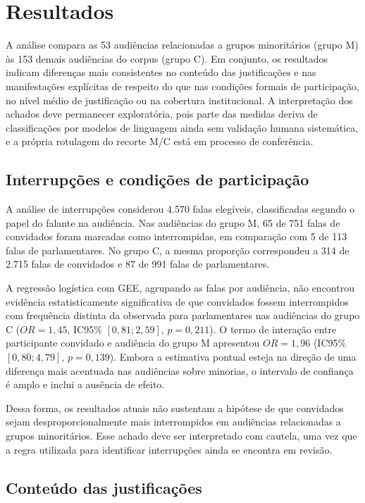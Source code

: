 \section{Resultados}

A análise compara as 53 audiências relacionadas a grupos minoritários
(grupo M) às 153 demais audiências do corpus (grupo C). Em conjunto, os
resultados indicam diferenças mais consistentes no conteúdo das justificações
e nas manifestações explícitas de respeito do que nas condições formais de
participação, no nível médio de justificação ou na cobertura institucional. A
interpretação dos achados deve permanecer exploratória, pois parte das
medidas deriva de classificações por modelos de linguagem ainda sem validação
humana sistemática, e a própria rotulagem do recorte M/C está em processo de
conferência.

\subsection{Interrupções e condições de participação}

A análise de interrupções considerou 4.570 falas elegíveis, classificadas
segundo o papel do falante na audiência. Nas audiências do grupo M, 65 de 751
falas de convidados foram marcadas como interrompidas, em comparação com 5 de
113 falas de parlamentares. No grupo C, a mesma proporção correspondeu a 314
de 2.715 falas de convidados e 87 de 991 falas de parlamentares.

A regressão logística com GEE, agrupando as falas por audiência, não encontrou
evidência estatisticamente significativa de que convidados fossem interrompidos
com frequência distinta da observada para parlamentares nas audiências do grupo
C ($OR=1{,}45$, IC95\% $[0{,}81;2{,}59]$, $p=0{,}211$). O termo de interação
entre participante convidado e audiência do grupo M apresentou $OR=1{,}96$
(IC95\% $[0{,}80;4{,}79]$, $p=0{,}139$). Embora a estimativa pontual esteja na
direção de uma diferença mais acentuada nas audiências sobre minorias, o
intervalo de confiança é amplo e inclui a ausência de efeito.

Dessa forma, os resultados atuais não sustentam a hipótese de que convidados
sejam desproporcionalmente mais interrompidos em audiências relacionadas a
grupos minoritários. Esse achado deve ser interpretado com cautela, uma vez
que a regra utilizada para identificar interrupções ainda se encontra em
revisão.

\subsection{Conteúdo das justificações}

